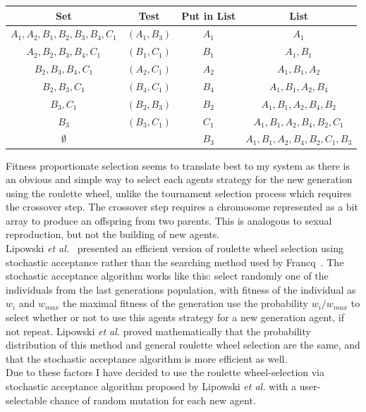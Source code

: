 \documentclass[]{final_report}
\begin{document}
\begin{framed}
	\begin{center}
		\begin{tabular}{c|c|c|c}
		Set & Test & Put in List & List\\
		\hline
		${A_1, A_2, B_1, B_2, B_3, B_4, C_1}$ & $(A_1, B_3)$ & $A_1$ & ${A_1}$ \\
		${A_2, B_2, B_3, B_4, C_1}$ & $(B_1, C_1)$ & $B_1$ & ${A_1, B_1}$\\
		${B_2, B_3, B_4, C_1}$ & $(A_2, C_1)$ & $A_2$ & ${A_1, B_1, A_2}$\\
		${B_2, B_3, C_1}$ & $(B_4, C_1)$ & $B_4$ & ${A_1, B_1, A_2, B_4}$\\
		${B_3, C_1}$ & $(B_2, B_3)$ & $B_2$ & ${A_1, B_1, A_2, B_4, B_2}$\\
		${B_3}$ & $(B_3, C_1)$ & $C_1$ & ${A_1, B_1, A_2, B_4, B_2, C_1}$\\
		$\emptyset$	& & $B_3$ & ${A_1, B_1, A_2, B_4, B_2, C_1, B_3}$
		\end{tabular}
		\label{tab:tournament_selection}
	\end{center}	
\end{framed}
Fitness proportionate selection seems to translate best to my system as there is an obvious and simple way to select each agents strategy for the new generation using the roulette wheel, unlike the tournament selection process which requires the crossover step. The crossover step requires a chromosome represented as a bit array to produce an offspring from two parents. This is analogous to sexual reproduction, but not the building of new agents.\\
Lipowski \textit{et al.}~\cite{lipowski2012roulette} presented an efficient version of roulette wheel selection using stochastic acceptance rather than the searching method used by Francq~\cite{genetic_algorithms}. The stochastic acceptance algorithm works like this: select randomly one of the individuals from the last generations population, with fitness of the individual as $w_i$ and $w_{max}$ the maximal fitness of the generation use the probability $w_i / w_{max}$ to select whether or not to use this agents strategy for a new generation agent, if not repeat. Lipowski \textit{et al.} proved mathematically that the probability distribution of this method and general roulette wheel selection are the same, and that the stochastic acceptance algorithm is more efficient as well.\\
Due to these factors I have decided to use the roulette wheel-selection via stochastic acceptance algorithm proposed by Lipowski \textit{et al.} with a user-selectable chance of random mutation for each new agent.
\end{document}
